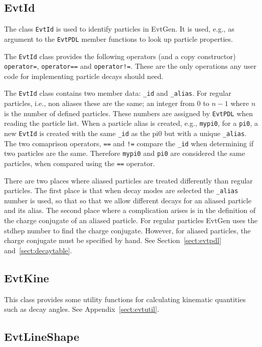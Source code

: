 \subsection{EvtId}

The class {\tt EvtId} is used to identify particles in EvtGen. It 
is used, e.g.,
as argument to the {\tt EvtPDL} member functions to look up
particle properties.

The {\tt EvtId} class provides the following operators (and a copy
constructor) {\tt operator=}, {\tt operator==} and {\tt operator!=}.
These are the only operations any user code for implementing
particle decays should need. 

The {\tt EvtId} class contains two member data: {\tt \_id} and
{\tt \_alias}. For regular particles, i.e., non aliases these
are the same; an integer from $0$ to $n-1$ where $n$ is the 
number of defined particles. These numbers are assigned by {\tt EvtPDL}
when reading the particle list. When a particle alias is
created, e.g., {\tt mypi0}, for a {\tt pi0}, a new {\tt EvtId} is created
with the same {\tt \_id} as the pi0 but with a unique
{\tt \_alias}. The two comaprison operators, {\tt ==}
and {\tt !=} compare the {\tt \_id} when determining if two
particles are the same. Therefore {\tt mypi0} and {\tt pi0} are 
considered the same particles, when compared using the {\tt ==} 
operator.

There are two places where aliased particles are treated differently
than regular particles. The first place is that when decay modes
are selected the {\tt \_alias} number is used, so that
so that we allow different decays for an aliased particle and
its alias. The
second place where a complication arises is in the definition
of the charge conjugate of an aliased particle. For regular 
particles EvtGen uses the stdhep number to find the charge conjugate.
However, for aliased particles, the charge conjugate must be
specified by hand. See Section~\ref{sect:evtpdl}
and~\ref{sect:decaytable}.


\subsection{EvtKine}

This class provides some utility functions for calculating 
kinematic quantities such as decay angles. See Appendix~\ref{sect:evtutil}.



\subsection{EvtLineShape}

